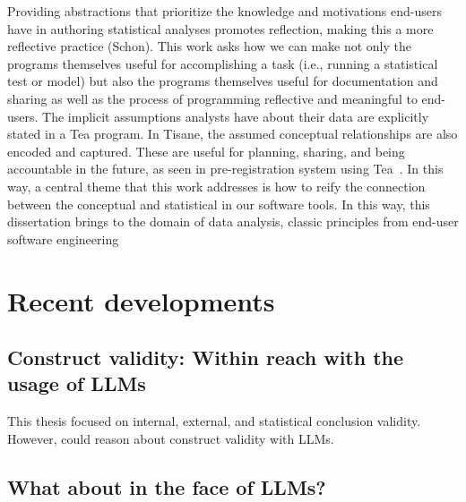 Providing abstractions that prioritize the knowledge and motivations end-users
have in authoring statistical analyses promotes reflection, making this a more
reflective practice (Schon). This work asks how we can make not only the
programs themselves useful for accomplishing a task (i.e., running a statistical
test or model) but also the programs themselves useful for documentation and
sharing as well as the process of programming reflective and meaningful to
end-users. The implicit assumptions analysts have about their data are
explicitly stated in a Tea program. In Tisane, the assumed conceptual
relationships are also encoded and captured. These are useful for planning,
sharing, and being accountable in the future, as seen in pre-registration system
using Tea~\cite{rock}. In this way, a central theme that this work addresses is
how to reify the connection between the conceptual and statistical in our
software tools. In this way, this dissertation brings to the domain of data
analysis, classic principles from end-user software engineering


\section{Recent developments}

\subsection{Construct validity: Within reach with the usage of LLMs}
This thesis focused on internal, external, and statistical conclusion validity. However, could reason about construct validity with LLMs.

\subsection{What about in the face of LLMs?}


